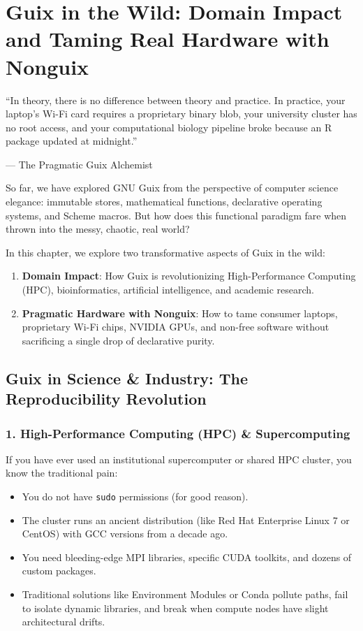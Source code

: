 \chapter{Guix in the Wild: Domain Impact and Taming Real Hardware with Nonguix}
\label{chap:domain-impact-and-nonguix}

\epigraph{``In theory, there is no difference between theory and practice. In practice, your laptop's Wi-Fi card requires a proprietary binary blob, your university cluster has no root access, and your computational biology pipeline broke because an R package updated at midnight.''}{--- The Pragmatic Guix Alchemist}

\noindent
So far, we have explored GNU Guix from the perspective of computer science elegance: immutable stores, mathematical functions, declarative operating systems, and Scheme macros. But how does this functional paradigm fare when thrown into the messy, chaotic, real world?

In this chapter, we explore two transformative aspects of Guix in the wild:
\begin{enumerate}
  \item \textbf{Domain Impact}: How Guix is revolutionizing High-Performance Computing (HPC), bioinformatics, artificial intelligence, and academic research.
  \item \textbf{Pragmatic Hardware with Nonguix}: How to tame consumer laptops, proprietary Wi-Fi chips, NVIDIA GPUs, and non-free software without sacrificing a single drop of declarative purity.
\end{enumerate}

\section{Guix in Science \& Industry: The Reproducibility Revolution}

\subsection{1. High-Performance Computing (HPC) \& Supercomputing}

If you have ever used an institutional supercomputer or shared HPC cluster, you know the traditional pain:
\begin{itemize}
  \item You do not have \texttt{sudo} permissions (for good reason).
  \item The cluster runs an ancient distribution (like Red Hat Enterprise Linux 7 or CentOS) with GCC versions from a decade ago.
  \item You need bleeding-edge MPI libraries, specific CUDA toolkits, and dozens of custom packages.
  \item Traditional solutions like Environment Modules or Conda pollute paths, fail to isolate dynamic libraries, and break when compute nodes have slight architectural drifts.
\end{itemize}

